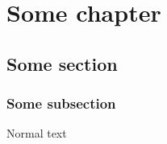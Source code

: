\documentclass{report}
\begin{document}
\chapter{Some chapter}
\section{Some section}
\subsection{Some subsection}
Normal text
\end{document}
